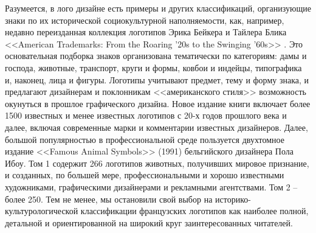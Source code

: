 Разумеется, в лого дизайне есть примеры и других классификаций,
организующие знаки по их исторической социокультурной наполняемости, как,
например, недавно переизданная коллекция логотипов Эрика Бейкера и Тайлера
Блика <<American Trademarks: From the Roaring '20s to the Swinging '60s>> \autocite{bakerblik2010}.
Это основательная подборка знаков организована тематически по категориям:
дамы и господа, животные, транспорт, круги и формы, ковбои и индейцы,
типографика и, наконец, лица и фигуры. Логотипы учитывают предмет, тему и
форму знака, и предлагают дизайнерам и поклонникам <<американского стиля>>
возможность окунуться в прошлое графического дизайна. Новое издание книги
включает более 1500 известных и менее известных логотипов с 20-х годов
прошлого века и далее, включая современные марки и комментарии известных
дизайнеров. Далее, большой популярностью в профессиональной среде пользуется
двухтомное издание <<Famous Animal Symbols>> (1991) бельгийского дизайнера Пола
Ибоу\autocite{ibou1991}.
Том 1 содержит 266 логотипов животных, получивших мировое признание, и
созданных, по большей мере, профессиональными и хорошо известными художниками,
графическими дизайнерами и рекламными агентствами. Том 2 -- более 250. Тем не
менее, мы остановили свой выбор на историко-культурологической классификации французских логотипов как наиболее полной, детальной и ориентированной на широкий круг
заинтересованных читателей.

